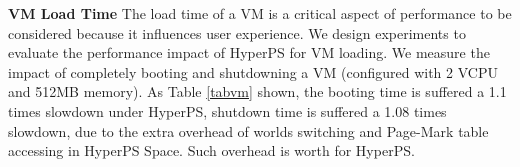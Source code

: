 \textbf {VM Load Time}
The load time of a VM is a critical aspect of performance to be considered because it influences user experience. We design experiments to evaluate the performance impact of HyperPS for VM loading.
 We measure the impact of completely booting and shutdowning a VM (configured with 2 VCPU and 512MB memory). As Table \ref{tabvm} shown, the booting time is suffered a 1.1 times slowdown under HyperPS, shutdown time is suffered a 1.08 times slowdown, due to the extra overhead of worlds switching and Page-Mark table accessing in HyperPS Space. Such overhead is worth for HyperPS.
